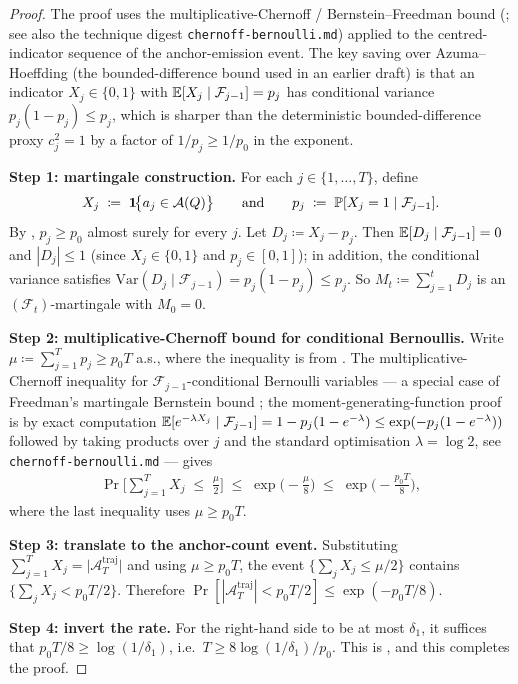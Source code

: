 \begin{proof}
The proof uses the multiplicative-Chernoff / Bernstein--Freedman bound
(\cite[Theorem 1.6]{freedman1975tail};
see also the technique digest \texttt{chernoff-bernoulli.md}) applied to
the centred-indicator sequence of the anchor-emission event. The key
saving over Azuma--Hoeffding (the bounded-difference bound used in an
earlier draft) is that an indicator $X_j \in \{0, 1\}$ with
$\mathbb{E}[X_j \mid \mathcal F_{j-1}] = p_j$ has conditional variance
$p_j(1 - p_j) \le p_j$, which is sharper than the deterministic
bounded-difference proxy $c_j^2 = 1$ by a factor of $1/p_j \ge 1/p_0$
in the exponent.

\noindent\textbf{Step 1: martingale construction.}
For each $j \in \{1, \dots, T\}$, define
\begin{align*}
   X_j \;\coloneqq\; \mathbf{1}\!\big\{a_j \in \mathcal{A}(Q)\big\}
   \qquad\text{and}\qquad
   p_j \;\coloneqq\; \mathbb{P}[X_j = 1 \mid \mathcal F_{j-1}].
\end{align*}
By , $p_j \ge p_0$ almost surely for every
$j$. Let $D_j \coloneqq X_j - p_j$. Then $\mathbb{E}[D_j \mid \mathcal F_{j-1}] = 0$
and $|D_j| \le 1$ (since $X_j \in \{0, 1\}$ and $p_j \in [0, 1]$); in
addition, the conditional variance satisfies
$\mathrm{Var}(D_j \mid \mathcal F_{j-1}) = p_j(1 - p_j) \le p_j$. So
$M_t \coloneqq \sum_{j=1}^{t} D_j$ is an $(\mathcal F_t)$-martingale with
$M_0 = 0$.

\noindent\textbf{Step 2: multiplicative-Chernoff bound for conditional
Bernoullis.}
Write $\mu \coloneqq \sum_{j=1}^{T} p_j \ge p_0 T$ a.s., where the
inequality is from . The
multiplicative-Chernoff inequality for $\mathcal F_{j-1}$-conditional
Bernoulli variables --- a special case of Freedman's martingale Bernstein
bound \cite[Theorem 1.6]{freedman1975tail}; the moment-generating-function
proof is by exact computation
$\mathbb{E}[e^{-\lambda X_j} \mid \mathcal F_{j-1}] = 1 - p_j(1 - e^{-\lambda})
\le \exp(-p_j(1 - e^{-\lambda}))$
followed by taking products over $j$ and the standard optimisation
$\lambda = \log 2$, see \texttt{chernoff-bernoulli.md} --- gives
\begin{align}\label{eq:chernoff_bernoulli_bound}
   \Pr\!\Big[\sum_{j=1}^{T} X_j \;\le\; \tfrac{\mu}{2}\Big]
   \;\le\;
   \exp\!\Big(-\tfrac{\mu}{8}\Big)
   \;\le\;
   \exp\!\Big(-\tfrac{p_0 T}{8}\Big),
\end{align}
where the last inequality uses $\mu \ge p_0 T$.

\noindent\textbf{Step 3: translate to the anchor-count event.}
Substituting
$\sum_{j=1}^{T} X_j = \big|\mathcal A^{\mathrm{traj}}_T\big|$ and using
$\mu \ge p_0 T$, the event $\{\sum_j X_j \le \mu/2\}$ contains
$\{\sum_j X_j < p_0 T / 2\}$. Therefore
$\Pr[|\mathcal A^{\mathrm{traj}}_T| < p_0 T / 2] \le \exp(-p_0 T / 8)$.

\noindent\textbf{Step 4: invert the rate.}
For the right-hand side to be at most $\delta_1$, it suffices that
$p_0 T / 8 \ge \log(1/\delta_1)$, i.e.\
$T \ge 8 \log(1/\delta_1) / p_0$. This is
, and this completes the proof.
\end{proof}


